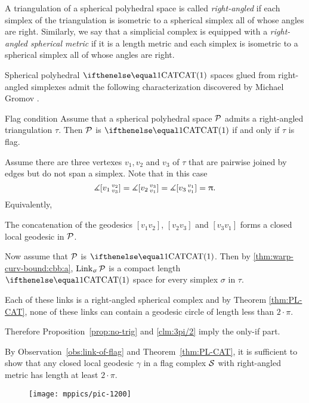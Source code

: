 A triangulation of a spherical polyhedral space 
is called \emph{right-angled} 
if each simplex of the triangulation is isometric 
to a spherical simplex all of whose angles are right.
Similarly, we say that a simplicial complex 
is equipped with a \emph{right-angled spherical metric}
if it is a length metric and each simplex is isometric 
to a spherical simplex all of whose angles are right.

Spherical polyhedral $\CAT1$ spaces glued from right-angled simplexes
admit the following characterization 
discovered by Michael Gromov \cite[p. 122]{gromov:hyp-groups}.

\begin{thm}{Flag condition}\label{thm:flag}
Assume that a spherical polyhedral space $\mathcal{P}$
admits a right-angled triangulation $\tau$.
Then $\mathcal{P}$ is $\CAT1$
if and only if $\tau$ is flag.
\end{thm}

Assume there are three vertexes $v_1,v_2$ and $v_3$ of $\tau$
that are pairwise joined by edges 
but do not span a simplex.
Note that in this case 
$$\measuredangle[v_1\,{}^{v_2}_{v_3}]=\measuredangle[v_2\,{}^{v_3}_{v_1}]=\measuredangle[v_3\,{}^{v_1}_{v_1}]=\uppi.$$
Equivalently,
\begin{clm}{}\label{clm:3pi/2}
The concatenation of the geodesics $[v_1v_2]$, $[v_2v_3]$ and $[v_3v_1]$
forms a closed local geodesic in $\mathcal{P}$. 
\end{clm}

Now assume that $\mathcal{P}$ is $\CAT1$.
Then by \ref{thm:warp-curv-bound:cbb:a},
$\mathop{\rm Link}\nolimits_\upsigma\mathcal{P}$ is a compact length $\CAT1$ space for every simplex $\sigma$ 
in $\tau$. 

Each of these links is a right-angled spherical complex
and
by Theorem \ref{thm:PL-CAT}, 
none
of these links can contain a geodesic circle of length less than $2\cdot\pi$. 

Therefore Proposition~\ref{prop:no-trig} and \ref{clm:3pi/2} 
imply the only-if part.

By Observation~\ref{obs:link-of-flag} and Theorem~\ref{thm:PL-CAT},
it is sufficient to show that any closed local geodesic $\gamma$ 
in a flag complex $\mathcal{S}$ with right-angled metric has length at least $2\cdot\pi$.

\begin{wrapfigure}{o}{45mm}
\vskip-2mm
\centering
\texttt{[image: mppics/pic-1200]}
\end{wrapfigure}


